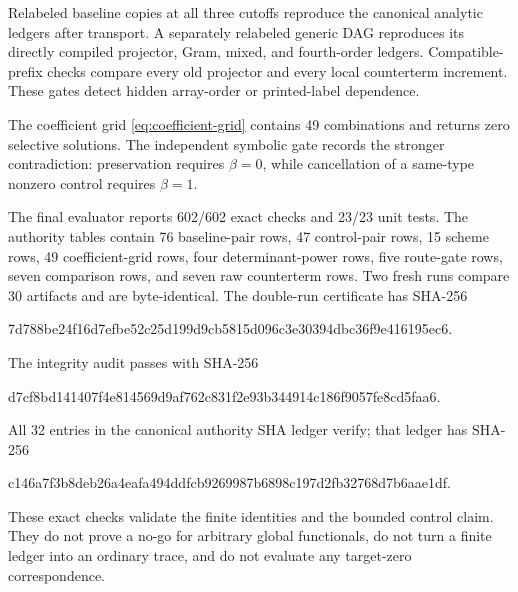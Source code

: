 Relabeled baseline copies at all three cutoffs reproduce the canonical
analytic ledgers after transport.  A separately relabeled generic DAG
reproduces its directly compiled projector, Gram, mixed, and fourth-order
ledgers.  Compatible-prefix checks compare every old projector and every
local counterterm increment.  These gates detect hidden array-order or
printed-label dependence.

The coefficient grid \eqref{eq:coefficient-grid} contains 49 combinations
and returns zero selective solutions.  The independent symbolic gate records
the stronger contradiction: preservation requires $\beta=0$, while
cancellation of a same-type nonzero control requires $\beta=1$.

The final evaluator reports 602/602 exact checks and 23/23 unit tests.  The
authority tables contain 76 baseline-pair rows, 47 control-pair rows, 15
scheme rows, 49 coefficient-grid rows, four determinant-power rows, five
route-gate rows, seven comparison rows, and seven raw counterterm rows.  Two
fresh runs compare 30 artifacts and are byte-identical.  The double-run
certificate has SHA-256
\begin{center}\small\ttfamily
7d788be24f16d7efbe52c25d199d9cb5815d096c3e30394dbc36f9e416195ec6.
\end{center}
The integrity audit passes with SHA-256
\begin{center}\small\ttfamily
d7cf8bd141407f4e814569d9af762c831f2e93b344914c186f9057fe8cd5faa6.
\end{center}
All 32 entries in the canonical authority SHA ledger verify; that ledger has
SHA-256
\begin{center}\small\ttfamily
c146a7f3b8deb26a4eafa494ddfcb9269987b6898c197d2fb32768d7b6aae1df.
\end{center}

These exact checks validate the finite identities and the bounded control
claim.  They do not prove a no-go for arbitrary global functionals, do not
turn a finite ledger into an ordinary trace, and do not evaluate any
target-zero correspondence.
